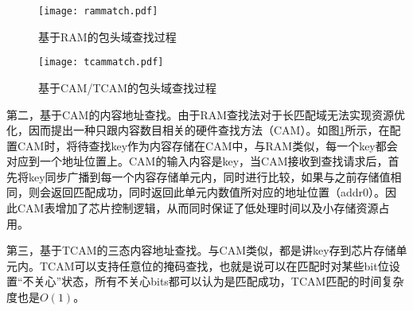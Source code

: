 \begin{figure}[htbp]
	\centering 
	\vspace{-1.5mm}
	\begin{minipage}[t]{0.39\textwidth}
		\centering
		\texttt{[image: rammatch.pdf]}
		\caption{基于RAM的包头域查找过程} \label{fig:rammatch}
	\end{minipage}
	\begin{minipage}[t]{0.6\textwidth}
		\centering
		\texttt{[image: tcammatch.pdf]}%
		\caption{基于CAM/TCAM的包头域查找过程} \label{fig:tcammatch}
	\end{minipage}
\end{figure}

第二，基于CAM的内容地址查找。由于RAM查找法对于长匹配域无法实现资源优化，因而提出一种只跟内容数目相关的硬件查找方法（CAM）。如图\ref{fig:tcammatch}所示，在配置CAM时，将待查找key作为内容存储在CAM中，与RAM类似，每一个key都会对应到一个地址位置上。CAM的输入内容是key，当CAM接收到查找请求后，首先将key同步广播到每一个内容存储单元内，同时进行比较，如果与之前存储值相同，则会返回匹配成功，同时返回此单元内数值所对应的地址位置（addr0）。因此CAM表增加了芯片控制逻辑，从而同时保证了低处理时间以及小存储资源占用。


第三，基于TCAM的三态内容地址查找。与CAM类似，都是讲key存到芯片存储单元内。TCAM可以支持任意位的掩码查找，也就是说可以在匹配时对某些bit位设置“不关心”状态，所有不关心bits都可以认为是匹配成功，TCAM匹配的时间复杂度也是$O(1)$。


